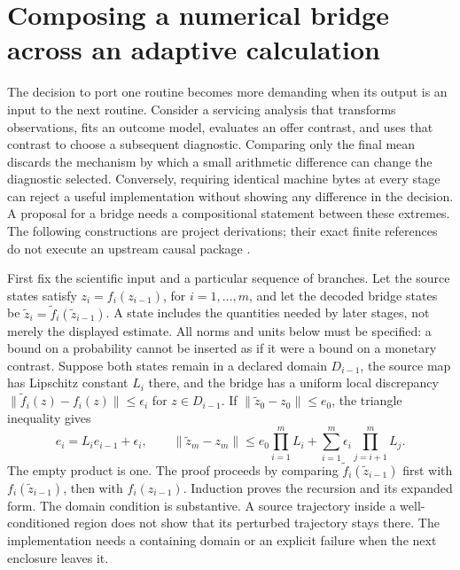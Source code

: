 \section{Composing a numerical bridge across an adaptive calculation}
\label{exec17:s9-composition}

The decision to port one routine becomes more demanding when its output is
an input to the next routine. Consider a servicing analysis that transforms
observations, fits an outcome model, evaluates an offer contrast, and uses that
contrast to choose a subsequent diagnostic. Comparing only the final mean
discards the mechanism by which a small arithmetic difference can change the
diagnostic selected. Conversely, requiring identical machine bytes at every
stage can reject a useful implementation without showing any difference in
the decision. A proposal for a bridge needs a compositional statement between
these extremes. The following constructions are project derivations; their
exact finite references do not execute an upstream causal package
\citep{exec17_s9_composition}.

First fix the scientific input and a particular sequence of branches. Let the
source states satisfy $z_i=f_i(z_{i-1})$, for $i=1,\ldots,m$, and let the decoded
bridge states be $\widetilde z_i=\widetilde f_i(\widetilde z_{i-1})$. A state
includes the quantities needed by later stages, not merely the displayed
estimate. All norms and units below must be specified: a bound on a probability
cannot be inserted as if it were a bound on a monetary contrast. Suppose both
states remain in a declared domain $D_{i-1}$, the source map has Lipschitz
constant $L_i$ there, and the bridge has a uniform local discrepancy
$\|\widetilde f_i(z)-f_i(z)\|\leq\epsilon_i$ for $z\in D_{i-1}$.
If $\|\widetilde z_0-z_0\|\leq e_0$, the triangle inequality gives
\begin{equation}
 e_i=L_i e_{i-1}+\epsilon_i,\qquad
 \|\widetilde z_m-z_m\|\leq
 e_0\prod_{i=1}^{m}L_i+
 \sum_{i=1}^{m}\epsilon_i\prod_{j=i+1}^{m}L_j.
 \label{exec17:s9-composed-error}
\end{equation}
The empty product is one. The proof proceeds by comparing
$\widetilde f_i(\widetilde z_{i-1})$ first with
$f_i(\widetilde z_{i-1})$, then with $f_i(z_{i-1})$. Induction proves the
recursion and its expanded form. The domain condition is substantive. A source
trajectory inside a well-conditioned region does not show that its perturbed
trajectory stays there. The implementation needs a containing domain or an
explicit failure when the next enclosure leaves it.

